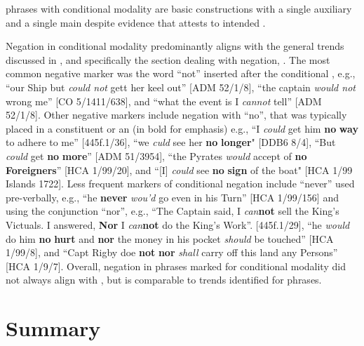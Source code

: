  phrases with conditional modality are basic constructions with a single auxiliary and a single main  despite evidence that attests to intended . 

Negation in conditional modality predominantly aligns with the general trends discussed in , and specifically the section dealing with negation, . The most common negative marker was the word “not” inserted after the conditional , e.g., “our Ship but \textit{could not} gett her keel out” [ADM 52/1/8], “the captain \textit{would not} wrong me” [CO 5/1411/638], and “what the event is I \textit{cannot} tell” [ADM 52/1/8]. Other negative markers include negation with “no”, that was typically placed in a  constituent or an  (in bold for emphasis) e.g., “I \textit{could} get him \textbf{no} \textbf{way} to adhere to me” [445f.1/36], “we \textit{culd} see her \textbf{no} \textbf{longer}" [DDB6 8/4], “But \textit{could} get \textbf{no} \textbf{more}” [ADM 51/3954], “the Pyrates \textit{would} accept of \textbf{no} \textbf{Foreigners}” [HCA 1/99/20], and “[I] \textit{could} see \textbf{no} \textbf{sign} of the boat" [HCA 1/99  Islands 1722]. Less frequent markers of conditional negation include “never” used pre-verbally, e.g., “he \textbf{never} \textit{wou’d} go even in his Turn” [HCA 1/99/156] and  using the conjunction “nor”, e.g., “The Captain said, I \textit{can}\textbf{not} sell the King’s Victuals. I answered, \textbf{Nor} I \textit{can}\textbf{not} do the King’s Work”. [445f.1/29], “he \textit{would} do him \textbf{no} \textbf{hurt} and \textbf{nor} the money in his pocket \textit{should} be touched” [HCA 1/99/8], and “Capt Rigby doe \textbf{not} \textbf{nor} \textit{shall} carry off this land any Persons” [HCA 1/9/7]. Overall, negation in  phrases marked for conditional modality did not always align with , but is comparable to trends identified for  phrases. 

\section{{Summary}}\label{sec:6.5}

